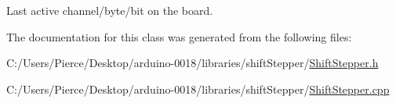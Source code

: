 Last active channel/byte/bit on the board. 



The documentation for this class was generated from the following files:\begin{DoxyCompactItemize}
\item 
C:/Users/Pierce/Desktop/arduino-\/0018/libraries/shiftStepper/\hyperlink{_shift_stepper_8h}{ShiftStepper.h}\item 
C:/Users/Pierce/Desktop/arduino-\/0018/libraries/shiftStepper/\hyperlink{_shift_stepper_8cpp}{ShiftStepper.cpp}\end{DoxyCompactItemize}
